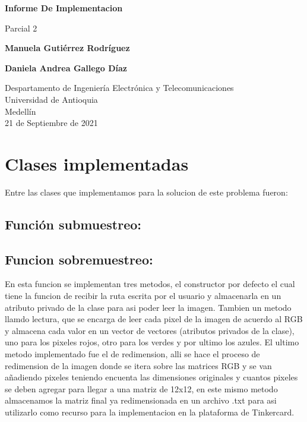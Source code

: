 \documentclass{article}
\begin{document}
\begin{titlepage}
    \begin{center}
        \vspace*{1cm}
            
        \Huge
        \textbf{Informe De Implementacion}
            
        \vspace{0.5cm}
        \LARGE
        Parcial 2
            
        \vspace{1.5cm}
            
        \textbf{Manuela Gutiérrez Rodríguez}
        \vspace{0.5cm}
        
        \textbf{Daniela Andrea Gallego Díaz}
            
        \vfill
            
        \vspace{0.8cm}
            
        \Large
        Despartamento de Ingeniería Electrónica y Telecomunicaciones\\
        Universidad de Antioquia\\
        Medellín\\
        21 de Septiembre de 2021
            
    \end{center}
\end{titlepage}

\tableofcontents
\newpage
\section{Clases implementadas}

Entre las clases que implementamos para la solucion de este problema fueron:

\subsection{Función submuestreo: }

\subsection{Funcion sobremuestreo:}
En esta funcion se implementan tres metodos, el constructor por defecto el cual tiene la funcion de recibir la ruta escrita por el usuario y almacenarla en un atributo privado de la clase para asi poder leer la imagen. Tambien un metodo llamdo lectura, que se encarga de leer cada pixel de la imagen de acuerdo al RGB y almacena cada valor en un vector de vectores (atributos privados de la clase), uno para los pixeles rojos, otro para los verdes y por ultimo los azules. El ultimo metodo implementado fue el de redimension, alli se hace el proceso de redimension de la imagen donde se itera sobre las matrices RGB y se van añadiendo pixeles teniendo encuenta las dimensiones originales y cuantos pixeles se deben agregar para llegar a una matriz de 12x12, en este mismo metodo almacenamos la matriz final ya redimensionada en un archivo .txt para asi utilizarlo como recurso para la implementacion en la plataforma de Tinkercard.
\end{document}
